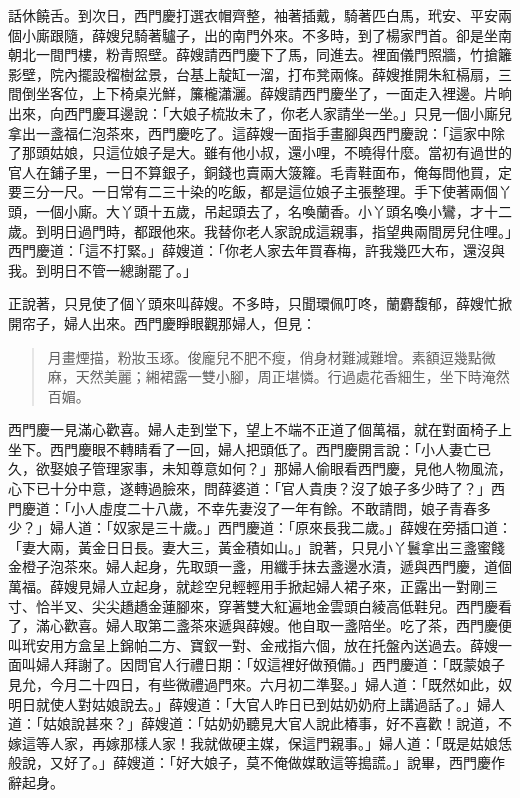 話休饒舌。到次日，西門慶打選衣帽齊整，袖著插戴，騎著匹白馬，玳安、平安兩個小廝跟隨，薛嫂兒騎著驢子，出的南門外來。不多時，到了楊家門首。卻是坐南朝北一間門樓，粉青照壁。薛嫂請西門慶下了馬，同進去。裡面儀門照牆，竹搶籬影壁，院內擺設榴樹盆景，台基上靛缸一溜，打布凳兩條。薛嫂推開朱紅槅扇，三間倒坐客位，上下椅桌光鮮，簾櫳瀟灑。薛嫂請西門慶坐了，一面走入裡邊。片晌出來，向西門慶耳邊說：「大娘子梳妝未了，你老人家請坐一坐。」只見一個小廝兒拿出一盞福仁泡茶來，西門慶吃了。這薛嫂一面指手畫腳與西門慶說：「這家中除了那頭姑娘，只這位娘子是大。雖有他小叔，還小哩，不曉得什麼。當初有過世的官人在鋪子里，一日不算銀子，銅錢也賣兩大箥籮。毛青鞋面布，俺每問他買，定要三分一尺。一日常有二三十染的吃飯，都是這位娘子主張整理。手下使著兩個丫頭，一個小廝。大丫頭十五歲，吊起頭去了，名喚蘭香。小丫頭名喚小鸞，才十二歲。到明日過門時，都跟他來。我替你老人家說成這親事，指望典兩間房兒住哩。」西門慶道：「這不打緊。」薛嫂道：「你老人家去年買春梅，許我幾匹大布，還沒與我。到明日不管一總謝罷了。」

正說著，只見使了個丫頭來叫薛嫂。不多時，只聞環佩叮咚，蘭麝馥郁，薛嫂忙掀開帘子，婦人出來。西門慶睜眼觀那婦人，但見：
\begin{quote}
月畫煙描，粉妝玉琢。俊龐兒不肥不瘦，俏身材難減難增。素額逗幾點微麻，天然美麗；緗裙露一雙小腳，周正堪憐。行過處花香細生，坐下時淹然百媚。
\end{quote}

西門慶一見滿心歡喜。婦人走到堂下，望上不端不正道了個萬福，就在對面椅子上坐下。西門慶眼不轉睛看了一回，婦人把頭低了。西門慶開言說：「小人妻亡已久，欲娶娘子管理家事，未知尊意如何？」那婦人偷眼看西門慶，見他人物風流，心下已十分中意，遂轉過臉來，問薛婆道：「官人貴庚？沒了娘子多少時了？」西門慶道：「小人虛度二十八歲，不幸先妻沒了一年有餘。不敢請問，娘子青春多少？」婦人道：「奴家是三十歲。」西門慶道：「原來長我二歲。」薛嫂在旁插口道：「妻大兩，黃金日日長。妻大三，黃金積如山。」說著，只見小丫鬟拿出三盞蜜餞金橙子泡茶來。婦人起身，先取頭一盞，用纖手抹去盞邊水漬，遞與西門慶，道個萬福。薛嫂見婦人立起身，就趁空兒輕輕用手掀起婦人裙子來，正露出一對剛三寸、恰半叉、尖尖趫趫金蓮腳來，穿著雙大紅遍地金雲頭白綾高低鞋兒。西門慶看了，滿心歡喜。婦人取第二盞茶來遞與薛嫂。他自取一盞陪坐。吃了茶，西門慶便叫玳安用方盒呈上錦帕二方、寶釵一對、金戒指六個，放在托盤內送過去。薛嫂一面叫婦人拜謝了。因問官人行禮日期：「奴這裡好做預備。」西門慶道：「既蒙娘子見允，今月二十四日，有些微禮過門來。六月初二準娶。」婦人道：「既然如此，奴明日就使人對姑娘說去。」薛嫂道：「大官人昨日已到姑奶奶府上講過話了。」婦人道：「姑娘說甚來？」薛嫂道：「姑奶奶聽見大官人說此椿事，好不喜歡！說道，不嫁這等人家，再嫁那樣人家！我就做硬主媒，保這門親事。」婦人道：「既是姑娘恁般說，又好了。」薛嫂道：「好大娘子，莫不俺做媒敢這等搗謊。」說畢，西門慶作辭起身。


